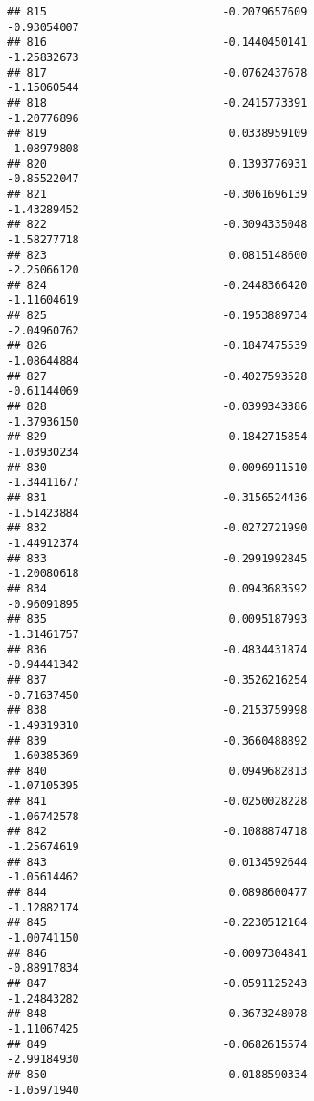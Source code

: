 \documentclass[
]{article}
\begin{document}
\begin{verbatim}
## 815                           -0.2079657609                -0.93054007
## 816                           -0.1440450141                -1.25832673
## 817                           -0.0762437678                -1.15060544
## 818                           -0.2415773391                -1.20776896
## 819                            0.0338959109                -1.08979808
## 820                            0.1393776931                -0.85522047
## 821                           -0.3061696139                -1.43289452
## 822                           -0.3094335048                -1.58277718
## 823                            0.0815148600                -2.25066120
## 824                           -0.2448366420                -1.11604619
## 825                           -0.1953889734                -2.04960762
## 826                           -0.1847475539                -1.08644884
## 827                           -0.4027593528                -0.61144069
## 828                           -0.0399343386                -1.37936150
## 829                           -0.1842715854                -1.03930234
## 830                            0.0096911510                -1.34411677
## 831                           -0.3156524436                -1.51423884
## 832                           -0.0272721990                -1.44912374
## 833                           -0.2991992845                -1.20080618
## 834                            0.0943683592                -0.96091895
## 835                            0.0095187993                -1.31461757
## 836                           -0.4834431874                -0.94441342
## 837                           -0.3526216254                -0.71637450
## 838                           -0.2153759998                -1.49319310
## 839                           -0.3660488892                -1.60385369
## 840                            0.0949682813                -1.07105395
## 841                           -0.0250028228                -1.06742578
## 842                           -0.1088874718                -1.25674619
## 843                            0.0134592644                -1.05614462
## 844                            0.0898600477                -1.12882174
## 845                           -0.2230512164                -1.00741150
## 846                           -0.0097304841                -0.88917834
## 847                           -0.0591125243                -1.24843282
## 848                           -0.3673248078                -1.11067425
## 849                           -0.0682615574                -2.99184930
## 850                           -0.0188590334                -1.05971940

\end{verbatim}
\end{document}
